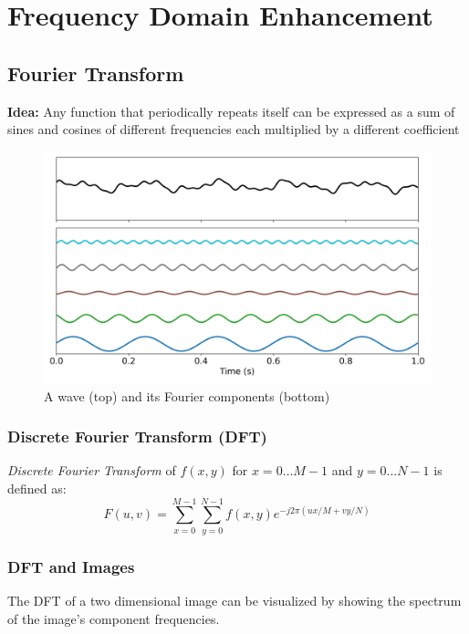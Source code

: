 \section*{Frequency Domain Enhancement}

\subsection*{Fourier Transform}

\textbf{Idea:} Any function that periodically repeats itself
can be expressed as a sum of sines and cosines of different
frequencies each multiplied by a different coefficient

\begin{figure}[H]
  \includegraphics[width=\linewidth]{images/fourier.png}
  \caption{A wave (top) and its Fourier components (bottom)}
\end{figure}

\subsubsection*{Discrete Fourier Transform (DFT)}

\textit{Discrete Fourier Transform} of $f(x, y)$ for $x = 0 \ldots
M-1$ and $y = 0 \ldots N-1$ is defined as:
\begin{equation*}
  F(u, v) = \sum_{x=0}^{M-1} \sum_{y=0}^{N-1} f(x, y)
  e^{-j2\pi\left(ux/M + vy/N\right)}
\end{equation*}

\subsubsection*{DFT and Images}

The DFT of a two dimensional image can be visualized by showing the
spectrum of the image's component frequencies.

